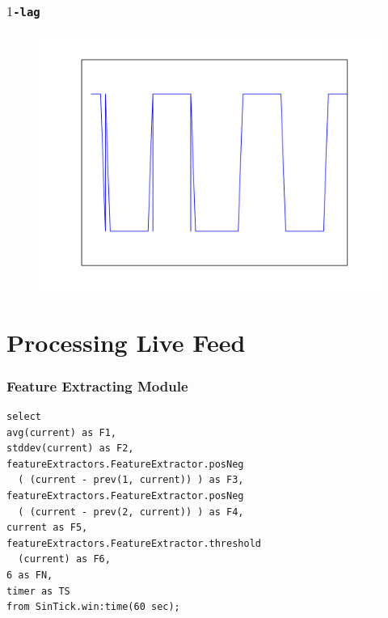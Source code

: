 \documentclass{beamer}
\begin{document}
  \begin{frame}[foot]
    \frametitle{\texttt{$1$-lag}}
    \begin{figure}
      \includegraphics[scale=.5]{./gfx/feature3.png}
    \end{figure}
  \end{frame}

\section{Processing Live Feed}

  \begin{frame}
    \frametitle{Feature Extracting Module}
    \begin{lstlisting}
select
avg(current) as F1,
stddev(current) as F2,
featureExtractors.FeatureExtractor.posNeg
  ( (current - prev(1, current)) ) as F3,
featureExtractors.FeatureExtractor.posNeg
  ( (current - prev(2, current)) ) as F4,
current as F5,
featureExtractors.FeatureExtractor.threshold
  (current) as F6,
6 as FN,
timer as TS
from SinTick.win:time(60 sec);
    \end{lstlisting}
  \end{frame}
\end{document}
